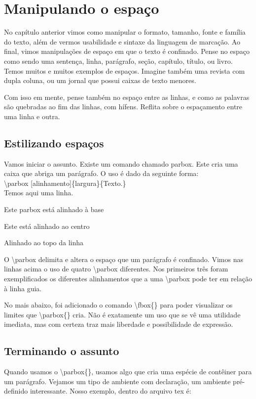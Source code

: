 \chapter{Manipulando o espaço}
No capítulo anterior vimos como manipular o formato, tamanho, fonte e família do texto,
além de vermos usabilidade e sintaxe da linguagem de marcação.
Ao final, vimos manipulações de espaço em que o texto é confinado.
Pense no espaço como sendo uma sentença, linha, parágrafo, seção,
capítulo, título, ou livro.
Temos muitos e muitos exemplos de espaços.
Imagine também uma revista com dupla coluna,
ou um jornal que possui caixas de texto menores.

Com isso em mente, pense também no espaço entre as linhas,
e como as palavras são quebradas ao fim das linhas, com hífens.
Reflita sobre o espaçamento entre uma linha e outra.

\section{Estilizando espaços}
Vamos iniciar o assunto.
Existe um comando chamado parbox.
Este cria uma caixa que abriga um parágrafo.
O uso é dado da seguinte forma:\\
\textbackslash parbox [alinhamento]\{largura\}\{Texto.\}
\\

Temos aqui uma linha.
\quad\parbox[b]{2.5cm}{Este parbox está alinhado à base}
\quad\parbox{2.5cm}{Este está alinhado ao centro}
\quad\parbox[t]{2.5cm}{Alinhado ao topo da linha}


O \textbackslash parbox delimita e altera o espaço que um parágrafo é confinado.
Vimos nas linhas acima o uso de quatro \textbackslash parbox diferentes.
Nos primeiros três foram exemplificados os diferentes alinhamentos que a uma \textbackslash parbox pode ter em relação à linha guia.

No mais abaixo, foi adicionado o comando \textbackslash fbox\{\}
para poder visualizar os limites que \textbackslash parbox\{\} cria.
Não é exatamente um uso que se vê uma utilidade imediata,
mas com certeza traz mais liberdade e possibilidade de expressão.

\section{Terminando o assunto}
Quando usamos o \textbackslash parbox\{\}, usamos algo que cria uma espécie de contêiner para um parágrafo.
Vejamos um tipo de ambiente com declaração, um ambiente pré-definido interessante.
Nosso exemplo, dentro do arquivo tex é:

